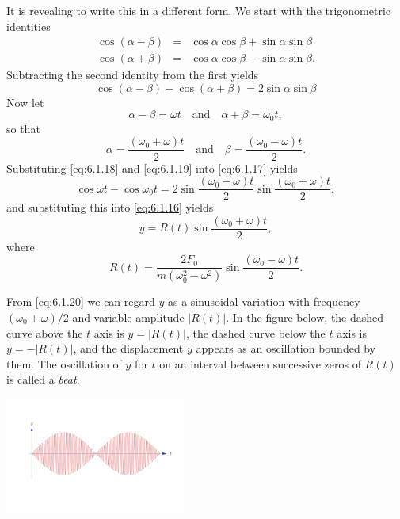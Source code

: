\documentclass{ximera}
\begin{document}
\begin{example}
\begin{explanation}
It is revealing to write this in a different form.  We start with the
trigonometric identities
\begin{eqnarray*}
\cos(\alpha-\beta)&=&\cos\alpha\cos\beta+\sin\alpha\sin\beta\\
\cos(\alpha+\beta)&=&\cos\alpha\cos\beta-\sin\alpha\sin\beta.
\end{eqnarray*}
Subtracting the second identity from the first yields
\begin{equation}\label{eq:6.1.17}
\cos(\alpha-\beta)-\cos(\alpha+\beta)=2\sin\alpha\sin\beta
\end{equation}
 Now let
\begin{equation}\label{eq:6.1.18}
\alpha-\beta=\omega t\quad\mbox{and}\quad\alpha+\beta=\omega_0t,
\end{equation}
 so that
\begin{equation}\label{eq:6.1.19}
\alpha=\frac{(\omega_0+\omega)t}{2}\quad\mbox{and}\quad\beta=\frac{(\omega_0-\omega
)t}{2}.
\end{equation}
 Substituting \eqref{eq:6.1.18} and \eqref{eq:6.1.19} into \eqref{eq:6.1.17}
yields
 $$
\cos\omega t-\cos\omega_0t=
2\sin\frac{(\omega_0-\omega)t}{2}\sin\frac{(\omega_0+\omega)t}{2},
$$
and substituting this into \eqref{eq:6.1.16} yields
\begin{equation}\label{eq:6.1.20}
y=R(t)\sin\frac{(\omega_0+\omega)t}{2},
\end{equation}
 where
\begin{equation}\label{eq:6.1.21}
R(t)=\frac{2F_0}{m(\omega_0^2-\omega^2)}
\sin\frac{(\omega_0-\omega)t}{2}.
\end{equation}

From \eqref{eq:6.1.20} we can regard $y$ as a sinusoidal variation with
frequency $(\omega_0+\omega)/2$ and variable amplitude
$|R(t)|$. In the figure below, the dashed curve above the $t$ axis
is $y=|R(t)|$, the dashed curve below the $t$ axis is $y=-|R(t)|$, and
the displacement $y$ appears as an oscillation bounded by them. The
oscillation of $y$ for $t$ on an interval between successive zeros of
$R(t)$ is called a \textit{beat}.



\begin{image}
  \includegraphics[height=1.5in]{fig060106.jpg} 
\end{image}





\end{explanation}
\end{example}
\end{document}
